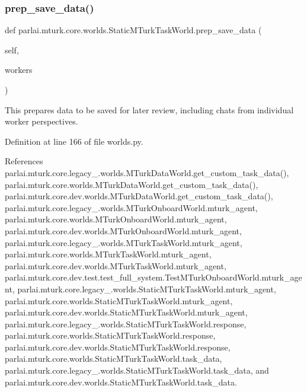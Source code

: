 \subsubsection{\texorpdfstring{prep\+\_\+save\+\_\+data()}{prep\_save\_data()}}
{\footnotesize\ttfamily def parlai.\+mturk.\+core.\+worlds.\+Static\+M\+Turk\+Task\+World.\+prep\+\_\+save\+\_\+data (\begin{DoxyParamCaption}\item[{}]{self,  }\item[{}]{workers }\end{DoxyParamCaption})}

\begin{DoxyVerb}This prepares data to be saved for later review, including
chats from individual worker perspectives.\end{DoxyVerb}
 

Definition at line 166 of file worlds.\+py.



References parlai.\+mturk.\+core.\+legacy\+\_.\+worlds.\+M\+Turk\+Data\+World.\+get\+\_\+custom\+\_\+task\+\_\+data(), parlai.\+mturk.\+core.\+worlds.\+M\+Turk\+Data\+World.\+get\+\_\+custom\+\_\+task\+\_\+data(), parlai.\+mturk.\+core.\+dev.\+worlds.\+M\+Turk\+Data\+World.\+get\+\_\+custom\+\_\+task\+\_\+data(), parlai.\+mturk.\+core.\+legacy\+\_.\+worlds.\+M\+Turk\+Onboard\+World.\+mturk\+\_\+agent, parlai.\+mturk.\+core.\+worlds.\+M\+Turk\+Onboard\+World.\+mturk\+\_\+agent, parlai.\+mturk.\+core.\+dev.\+worlds.\+M\+Turk\+Onboard\+World.\+mturk\+\_\+agent, parlai.\+mturk.\+core.\+legacy\+\_.\+worlds.\+M\+Turk\+Task\+World.\+mturk\+\_\+agent, parlai.\+mturk.\+core.\+worlds.\+M\+Turk\+Task\+World.\+mturk\+\_\+agent, parlai.\+mturk.\+core.\+dev.\+worlds.\+M\+Turk\+Task\+World.\+mturk\+\_\+agent, parlai.\+mturk.\+core.\+dev.\+test.\+test\+\_\+full\+\_\+system.\+Test\+M\+Turk\+Onboard\+World.\+mturk\+\_\+agent, parlai.\+mturk.\+core.\+legacy\+\_.\+worlds.\+Static\+M\+Turk\+Task\+World.\+mturk\+\_\+agent, parlai.\+mturk.\+core.\+worlds.\+Static\+M\+Turk\+Task\+World.\+mturk\+\_\+agent, parlai.\+mturk.\+core.\+dev.\+worlds.\+Static\+M\+Turk\+Task\+World.\+mturk\+\_\+agent, parlai.\+mturk.\+core.\+legacy\+\_.\+worlds.\+Static\+M\+Turk\+Task\+World.\+response, parlai.\+mturk.\+core.\+worlds.\+Static\+M\+Turk\+Task\+World.\+response, parlai.\+mturk.\+core.\+dev.\+worlds.\+Static\+M\+Turk\+Task\+World.\+response, parlai.\+mturk.\+core.\+worlds.\+Static\+M\+Turk\+Task\+World.\+task\+\_\+data, parlai.\+mturk.\+core.\+legacy\+\_.\+worlds.\+Static\+M\+Turk\+Task\+World.\+task\+\_\+data, and parlai.\+mturk.\+core.\+dev.\+worlds.\+Static\+M\+Turk\+Task\+World.\+task\+\_\+data.

